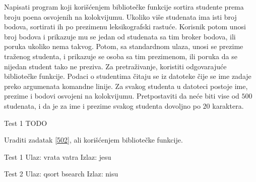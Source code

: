 \begin{Exercise}[label=521]
  Napisati program koji korišćenjem bibliotečke funkcije 
  sortira studente prema broju poena osvojenih na kolokvijumu. Ukoliko
  više studenata ima isti broj bodova, sortirati ih po prezimenu
  leksikografski rastuće. Korisnik potom unosi broj bodova i prikazuje
  mu se jedan od studenata sa tim broker bodova, ili poruka ukoliko
  nema takvog. Potom, sa standardnom ulaza, unosi se prezime traženog
  studenta, i prikazuje se osoba sa tim prezimenom, ili poruka da se
  nijedan student tako ne preziva. Za pretraživanje, koristiti
  odgovarajuće bibliotečke funkcije. Podaci o studentima čitaju se iz
  datoteke čije se ime zadaje preko argumenata komandne linije. Za
  svakog studenta u datoteci postoje ime, prezime i bodovi osvojeni na
  kolokvijumu. Pretpostaviti da neće biti vise od $500$ studenata, i
  da je za ime i prezime svakog studenta dovoljno po $20$ karaktera.
  
\begin{miditest}
\begin{test}{Test 1}
TODO
\end{test}
\end{miditest}
  
\end{Exercise}

\begin{Exercise}[label=522]
  Uraditi zadatak \ref{502}, ali korišćenjem bibliotečke 
  funkcije.
  
\begin{minitest}
\begin{test}{Test 1}
Ulaz:   vrata vatra
Izlaz:  jesu
\end{test}
\end{minitest}
\begin{miditest}
\begin{test}{Test 2}
Ulaz:   qsort bsearch
Izlaz:  nisu
\end{test}
\end{miditest}
  
\end{Exercise}

